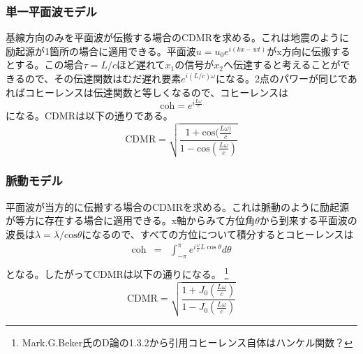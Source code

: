 \documentclass[a4paper,12pt]{jsarticle}
\begin{document}
\subsubsection{単一平面波モデル}
基線方向のみを平面波が伝搬する場合のCDMRを求める。これは地震のように励起源が1箇所の場合に適用できる。平面波$u=u_0 e^{i(kx-wt)}$がx方向に伝搬するとする。この場合$\tau=L/c$ほど遅れて$x_1$の信号が$x_2$へ伝達すると考えることができるので、その伝達関数はむだ遅れ要素$e^{i(L/c)\omega}$になる。2点のパワーが同じであればコヒーレンスは伝達関数と等しくなるので、コヒーレンスは
\begin{equation}
  \mathrm{coh}=e^{i\frac{L\omega}{c}}
\end{equation}
になる。CDMRは以下の通りである。
\begin{equation}  \label{eq:eq18}
  \boxed{\mathrm{CDMR} = \sqrt{\frac{1+\mathrm{cos}(\frac{L\omega)}{c}}{1-\mathrm{cos}(\frac{L\omega}{c})}}}
\end{equation}

\subsubsection{脈動モデル}
平面波が当方的に伝搬する場合のCDMRを求める。これは脈動のように励起源が等方に存在する場合に適用できる。x軸からみて方位角$\theta$から到来する平面波の波長は$\lambda=\lambda/\mathrm{cos}\theta$になるので、すべての方位について積分するとコヒーレンスは
\begin{eqnarray}
  \mathrm{coh} &=& \int_{-\pi}^{\pi} e^{i\frac{\omega}{c} L\cos \theta} d \theta \\
\end{eqnarray}
となる。したがってCDMRは以下の通りになる。
\footnote[0]{Mark.G.Beker氏のD論の1.3.2から引用コヒーレンス自体はハンケル関数？}
\begin{equation}  \label{eq:eq19}
  \boxed{\mathrm{CDMR} = \sqrt{\frac{1+J_0(\frac{L\omega}{c})}{1-J_0(\frac{L\omega}{c})}}} 
\end{equation}


\end{document}
